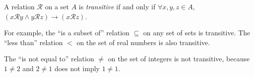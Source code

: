\documentclass[12pt]{article}
\begin{document}
A relation $\mathcal{R}$ on a set $A$ is \emph{transitive} if and only if
$\forall x,y,z \in A$, $(x\mathcal{R}y \land y\mathcal{R}z) \rightarrow (x\mathcal{R}z)$.

For example, the ``is a subset of'' relation $\subseteq$
on any set of sets is transitive.
The ``less than'' relation $<$ on the set of real numbers
is also transitive.

The ``is not equal to'' relation $\neq$
on the set of integers is not transitive,
because $1\neq 2$ and $2\neq 1$ does not imply $1\neq 1$.

\end{document}
